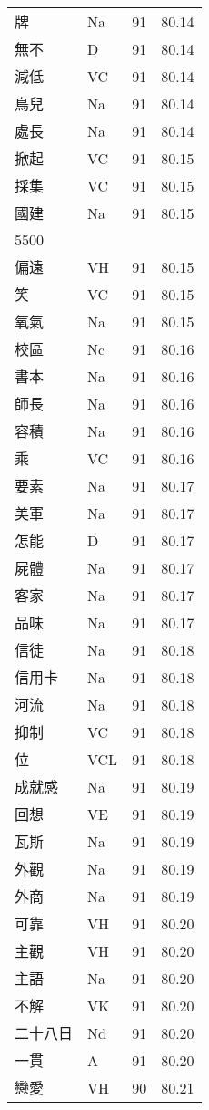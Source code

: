 \documentclass[twocolumn]{book}
\begin{document}
\begin{supertabular}{llrr}
牌 & Na & 91 &  80.14\\
無不 & D & 91 &  80.14\\
減低 & VC & 91 &  80.14\\
鳥兒 & Na & 91 &  80.14\\
處長 & Na & 91 &  80.14\\
掀起 & VC & 91 &  80.15\\
採集 & VC & 91 &  80.15\\
國建 & Na & 91 &  80.15\\
5500\\
偏遠 & VH & 91 &  80.15\\
笑 & VC & 91 &  80.15\\
氧氣 & Na & 91 &  80.15\\
校區 & Nc & 91 &  80.16\\
書本 & Na & 91 &  80.16\\
師長 & Na & 91 &  80.16\\
容積 & Na & 91 &  80.16\\
乘 & VC & 91 &  80.16\\
要素 & Na & 91 &  80.17\\
美軍 & Na & 91 &  80.17\\
怎能 & D & 91 &  80.17\\
屍體 & Na & 91 &  80.17\\
客家 & Na & 91 &  80.17\\
品味 & Na & 91 &  80.17\\
信徒 & Na & 91 &  80.18\\
信用卡 & Na & 91 &  80.18\\
河流 & Na & 91 &  80.18\\
抑制 & VC & 91 &  80.18\\
位 & VCL & 91 &  80.18\\
成就感 & Na & 91 &  80.19\\
回想 & VE & 91 &  80.19\\
瓦斯 & Na & 91 &  80.19\\
外觀 & Na & 91 &  80.19\\
外商 & Na & 91 &  80.19\\
可靠 & VH & 91 &  80.20\\
主觀 & VH & 91 &  80.20\\
主語 & Na & 91 &  80.20\\
不解 & VK & 91 &  80.20\\
二十八日 & Nd & 91 &  80.20\\
一貫 & A & 91 &  80.20\\
戀愛 & VH & 90 &  80.21\\

\end{supertabular}
\end{document}
